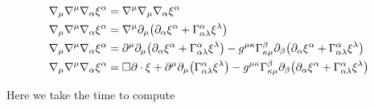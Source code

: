 \begin{align*}
    \nabla_\mu\nabla^\mu\nabla_\alpha\xi^\alpha&=\nabla^\mu\nabla_\mu\nabla_\alpha\xi^\alpha\\
    \nabla_\mu\nabla^\mu\nabla_\alpha\xi^\alpha&=\nabla^\mu\partial_\mu\qty(\partial_\alpha\xi^\alpha+\Gamma^\alpha_{\alpha\lambda}\xi^\lambda)\\
    \nabla_\mu\nabla^\mu\nabla_\alpha\xi^\alpha&=\partial^\mu\partial_\mu\qty(\partial_\alpha\xi^\alpha+\Gamma^\alpha_{\alpha\lambda}\xi^\lambda)-g^{\mu\kappa}\Gamma^\beta_{\kappa\mu}\partial_\beta\qty(\partial_\alpha\xi^\alpha+\Gamma^\alpha_{\alpha\lambda}\xi^\lambda)\\
    \nabla_\mu\nabla^\mu\nabla_\alpha\xi^\alpha&=\square\partial\cdot\xi+\partial^\mu\partial_\mu\qty(\Gamma^\alpha_{\alpha\lambda}\xi^\lambda)-g^{\mu\kappa}\Gamma^\beta_{\kappa\mu}\partial_\beta\qty(\partial_\alpha\xi^\alpha+\Gamma^\alpha_{\alpha\lambda}\xi^\lambda)
\end{align*}

Here we take the time to compute

\probitem{}